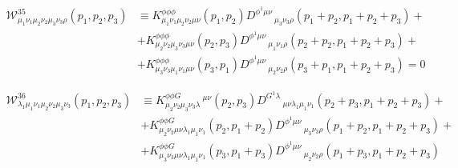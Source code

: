 \documentclass[11pt, oneside]{article}   	%
\newcommand{\W}{\mathcal{W}}
\begin{document}
\begin{equation} 
\begin{split} 
\W^{35}_{\mu_1 \nu_1 \mu_2 \nu_2 \mu_3 \nu_3 \rho } (p_1, p_2, p_3) &\equiv K^{\phi\phi\phi} _{\mu_1 \nu_1 \mu_2 \nu_2 \mu \nu} (p_1, p_2) D^{\phi^{1} \mu\nu}\,_{\mu_3 \nu_3 \rho} (p_1 +p_2, p_1 + p_2 + p_3) +\\ &+ K^{\phi\phi\phi} _{\mu_2 \nu_2 \mu_3 \nu_3 \mu \nu} (p_2, p_3) D^{\phi^{1} \mu\nu}\,_{\mu_1 \nu_1 \rho} (p_2 +p_2, p_1 + p_2 + p_3)  +\\&+ K^{\phi\phi\phi} _{\mu_3 \nu_3 \mu_1 \nu_1 \mu \nu} (p_3, p_1) D^{\phi^{1} \mu\nu}\,_{\mu_2 \nu_2 \rho} (p_3 +p_1, p_1 + p_2 + p_3) = 0 \end{split} \end{equation}

\begin{equation} 
\begin{split}
\W^{36}_{\lambda_1 \mu_1 \nu_1 \mu_2 \nu_2 \mu_3 \nu_3} (p_1, p_2, p_3) &\equiv K^{\phi\phi G} _{\mu_2 \nu_2 \mu_3 \nu_3 \lambda}\,^{\mu\nu} (p_2,p_3) D^{G^{1} \lambda}\,_{\mu\nu \lambda_1 \mu_1 \nu_1} (p_2 + p_3, p_1 + p_2 + p_3) + \\ &+ K^{\phi \phi G}_{\mu_2 \nu_2 \mu \nu \lambda_1 \mu_1 \nu_1} (p_2, p_1 + p_2) D^{\phi^{1} \mu\nu}\,_{\mu_3 \nu_3 \rho} (p_1 + p_2, p_1 + p_2 + p_3) + \\ &+  K^{\phi \phi G}_{\mu_3 \nu_3 \mu \nu \lambda_1 \mu_1 \nu_1} (p_3, p_1 + p_3) D^{\phi^{1} \mu\nu}\,_{\mu_2 \nu_2 \rho} (p_1 + p_3, p_1 + p_2 + p_3)
\end{split} \end{equation}
\end{document}
